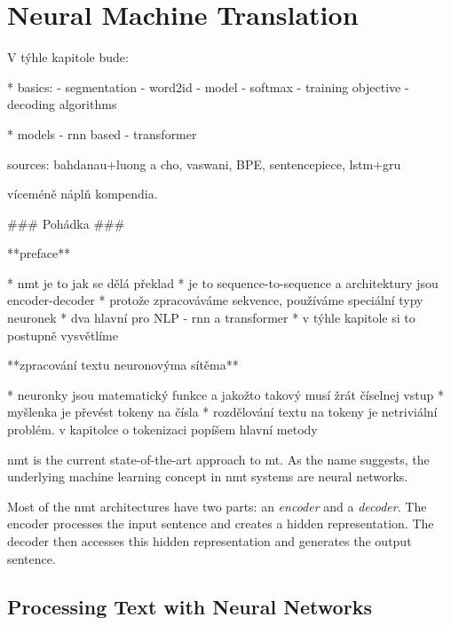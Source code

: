 \chapter{Neural Machine Translation}
\label{chap:nmt}

\begin{markdown}
V týhle kapitole bude:

* basics:
    - segmentation
    - word2id
    - model
    - softmax
    - training objective
    - decoding algorithms

* models
    - rnn based
    - transformer

sources:
bahdanau+luong a cho, vaswani, BPE, sentencepiece, lstm+gru

víceméně náplň kompendia.


### Pohádka ###

**preface**

* \gls{nmt} je to jak se dělá překlad
* je to sequence-to-sequence a architektury jsou encoder-decoder
* protože zpracováváme sekvence, používáme speciální typy neuronek
* dva hlavní pro NLP - rnn a transformer
* v týhle kapitole si to postupně vysvětlíme

**zpracování textu neuronovýma sítěma**

* neuronky jsou matematický funkce a jakožto takový musí žrát číselnej vstup
* myšlenka je převést tokeny na čísla
* rozdělování textu na tokeny je netriviální problém. v kapitolce o tokenizaci popíšem hlavní metody


\end{markdown}


\gls{nmt} is the current state-of-the-art approach to \gls{mt}. As the name
suggests, the underlying machine learning concept in \gls{nmt} systems are
neural networks.

Most of the \gls{nmt} architectures have two parts: an \emph{encoder} and a
\emph{decoder}. The encoder processes the input sentence and creates a hidden
representation. The decoder then accesses this hidden representation and
generates the output sentence.


\section{Processing Text with Neural Networks}


